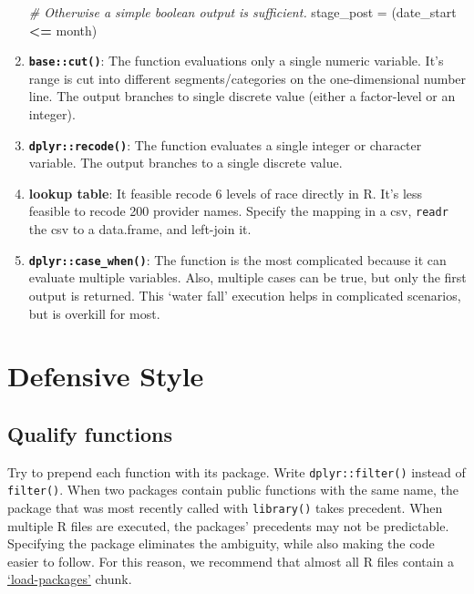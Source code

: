 \documentclass[
]{book}
\newenvironment{Shaded}{\begin{snugshade}}{\end{snugshade}}
\newcommand{\CommentTok}[1]{\textcolor[rgb]{0.56,0.35,0.01}{\textit{#1}}}
\newcommand{\NormalTok}[1]{#1}
\newcommand{\OperatorTok}[1]{\textcolor[rgb]{0.81,0.36,0.00}{\textbf{#1}}}
\newcommand{\StringTok}[1]{\textcolor[rgb]{0.31,0.60,0.02}{#1}}
\begin{document}
\begin{enumerate}
\begin{Shaded}
\begin{Highlighting}[]
\CommentTok{\# Otherwise a simple boolean output is sufficient.}
\NormalTok{stage\_post  =}\StringTok{ }\NormalTok{(date\_start }\OperatorTok{<=}\StringTok{ }\NormalTok{month)}
\end{Highlighting}
\end{Shaded}
\item
  \textbf{\texttt{base::cut()}}: The function evaluations only a single numeric variable. It's range is cut into different segments/categories on the one-dimensional number line. The output branches to single discrete value (either a factor-level or an integer).
\item
  \textbf{\texttt{dplyr::recode()}}: The function evaluates a single integer or character variable. The output branches to a single discrete value.
\item
  \textbf{lookup table}: It feasible recode 6 levels of race directly in R. It's less feasible to recode 200 provider names. Specify the mapping in a csv, \texttt{readr} the csv to a data.frame, and left-join it.
\item
  \textbf{\texttt{dplyr::case\_when()}}: The function is the most complicated because it can evaluate multiple variables. Also, multiple cases can be true, but only the first output is returned. This `water fall' execution helps in complicated scenarios, but is overkill for most.
\end{enumerate}

\hypertarget{coding-defensive}{%
\section{Defensive Style}\label{coding-defensive}}

\hypertarget{coding-defensive-qualify-functions}{%
\subsection{Qualify functions}\label{coding-defensive-qualify-functions}}

Try to prepend each function with its package. Write \texttt{dplyr::filter()} instead of \texttt{filter()}. When two packages contain public functions with the same name, the package that was most recently called with \texttt{library()} takes precedent. When multiple R files are executed, the packages' precedents may not be predictable. Specifying the package eliminates the ambiguity, while also making the code easier to follow. For this reason, we recommend that almost all R files contain a \protect\hyperlink{chunk-load-packages}{`load-packages'} chunk.
\end{document}
